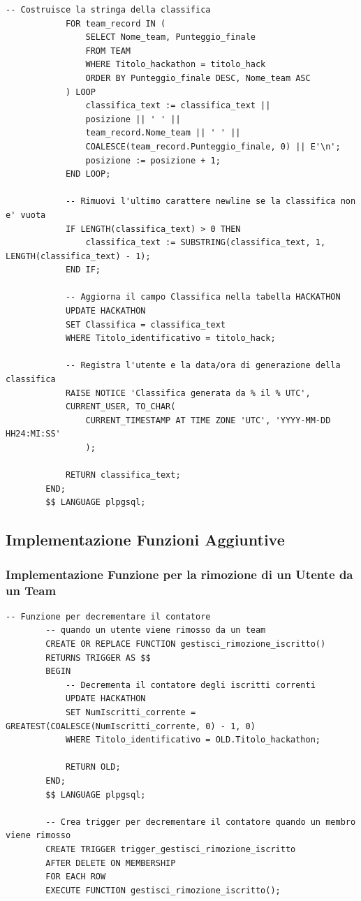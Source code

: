\documentclass[a4paper, 10pt]{article}
\begin{document}
\begin{lstlisting}[style=sqlstyle]
			-- Costruisce la stringa della classifica
			FOR team_record IN (
				SELECT Nome_team, Punteggio_finale
				FROM TEAM
				WHERE Titolo_hackathon = titolo_hack
				ORDER BY Punteggio_finale DESC, Nome_team ASC
			) LOOP
				classifica_text := classifica_text || 
				posizione || ' ' || 
				team_record.Nome_team || ' ' || 
				COALESCE(team_record.Punteggio_finale, 0) || E'\n';
				posizione := posizione + 1;
			END LOOP;
			
			-- Rimuovi l'ultimo carattere newline se la classifica non e' vuota
			IF LENGTH(classifica_text) > 0 THEN
				classifica_text := SUBSTRING(classifica_text, 1, LENGTH(classifica_text) - 1);
			END IF;
			
			-- Aggiorna il campo Classifica nella tabella HACKATHON
			UPDATE HACKATHON
			SET Classifica = classifica_text
			WHERE Titolo_identificativo = titolo_hack;
			
			-- Registra l'utente e la data/ora di generazione della classifica
			RAISE NOTICE 'Classifica generata da % il % UTC', 
			CURRENT_USER, TO_CHAR(
				CURRENT_TIMESTAMP AT TIME ZONE 'UTC', 'YYYY-MM-DD HH24:MI:SS'
				);
			
			RETURN classifica_text;
		END;
		$$ LANGUAGE plpgsql;
	\end{lstlisting}
	\newpage
	\subsection{Implementazione Funzioni Aggiuntive}
	\subsubsection{Implementazione Funzione per la rimozione di un Utente da un Team}
	\begin{lstlisting}[style=sqlstyle]
		-- Funzione per decrementare il contatore 
		-- quando un utente viene rimosso da un team
		CREATE OR REPLACE FUNCTION gestisci_rimozione_iscritto()
		RETURNS TRIGGER AS $$
		BEGIN
			-- Decrementa il contatore degli iscritti correnti
			UPDATE HACKATHON
			SET NumIscritti_corrente = GREATEST(COALESCE(NumIscritti_corrente, 0) - 1, 0)
			WHERE Titolo_identificativo = OLD.Titolo_hackathon;
			
			RETURN OLD;
		END;
		$$ LANGUAGE plpgsql;
		
		-- Crea trigger per decrementare il contatore quando un membro viene rimosso
		CREATE TRIGGER trigger_gestisci_rimozione_iscritto
		AFTER DELETE ON MEMBERSHIP
		FOR EACH ROW
		EXECUTE FUNCTION gestisci_rimozione_iscritto();
	\end{lstlisting}
\end{document}
